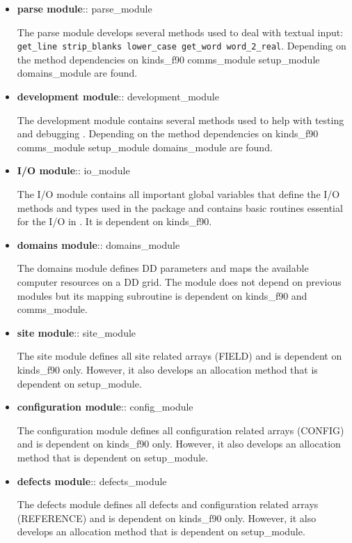 \begin{itemize}
\item {\bf parse module}:: {\sc parse\_module}

The parse module develops several methods used to deal with
textual input: {\tt get\_line strip\_blanks lower\_case get\_word
word\_2\_real}.  Depending on the method dependencies on
{\sc kinds\_f90 comms\_module setup\_module domains\_module} are found.

\item {\bf development module}:: {\sc development\_module}

The development module contains several methods used to help with
testing and debugging \D.  Depending on the method dependencies on
{\sc kinds\_f90 comms\_module setup\_module domains\_module} are found.

\item {\bf I/O module}:: {\sc io\_module}

The I/O module contains all important global variables that define
the I/O methods and types used in the package and contains
basic routines essential for the I/O in \D.  It is dependent on
{\sc kinds\_f90}.

\item {\bf domains module}:: {\sc domains\_module}

The domains module defines DD parameters and maps the available
computer resources on a DD grid.  The module does not depend on
previous modules but its mapping subroutine is dependent on
{\sc kinds\_f90} and {\sc comms\_module}.

\item {\bf site module}:: {\sc site\_module}

The site module defines all site related arrays (FIELD) and is
dependent on {\sc kinds\_f90} only.  However, it also develops an
allocation method that is dependent on {\sc setup\_module}.

\item {\bf configuration module}:: {\sc config\_module}

The configuration module defines all configuration related arrays
(CONFIG) and is dependent on {\sc kinds\_f90} only.  However, it
also develops an allocation method that is dependent on
{\sc setup\_module}.

\item {\bf defects module}:: {\sc defects\_module}

The defects module defines all defects and configuration related
arrays (REFERENCE) and is dependent on {\sc kinds\_f90} only.
However, it also develops an allocation method that is dependent
on {\sc setup\_module}.


\end{itemize}
